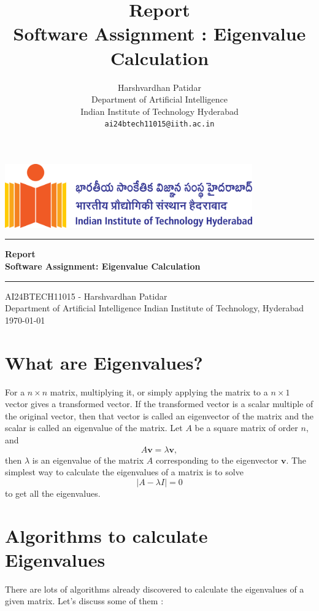 \documentclass{article}
\title{Report\\Software Assignment : Eigenvalue Calculation}
\author{Harshvardhan Patidar\\
  Department of Artificial Intelligence\\
  Indian Institute of Technology Hyderabad\\
  \texttt{ai24btech11015@iith.ac.in}
}
\newcommand{\theTitle}{Software Assignment: Eigenvalue Calculation}  %
\newcommand{\theAuthor}{AI24BTECH11015 - Harshvardhan Patidar}
\renewcommand{\vec}[1]{\mathbf{#1}}
\begin{document}
\begin{titlepage}
\pagestyle{empty}
\centering
\includegraphics[width=0.8\textwidth]{images/horzlogolong.png}
\vspace{60mm}
\hrule\vspace{2mm}
{\LARGE \textbf{\textcolor{mygreen}{Report}}}\\[8pt]
{\LARGE \textbf{\textcolor{mygreen}{\theTitle}}} \\  %
\vspace{5mm}\hrule\vspace{20mm}
{\large \theAuthor} \\[5pt]  %
{\large Department of Artificial Intelligence}
\vfill                %
{\normalsize Indian Institute of Technology, Hyderabad \\[4pt]\today} 
\end{titlepage}



\newpage
\tableofcontents
\newpage

\section{What are Eigenvalues?}\cite{youtubeeig}
For a $n \times n$ matrix, multiplying it, or simply applying the matrix to a $n \times 1$ vector gives a transformed vector. If the transformed vector is a scalar multiple of the original vector, then that vector is called an eigenvector of the matrix and the scalar is called an eigenvalue of the matrix. Let $A$ be a square matrix of order $n$, and $$A \vec{v} = \lambda \vec{v},$$ then $\lambda$ is an eigenvalue of the matrix $A$ corresponding to the eigenvector $\vec{v}$. The simplest way to calculate the eigenvalues of a matrix is to solve $$|A -\lambda I| = 0$$ to get all the eigenvalues.

\section{Algorithms to calculate Eigenvalues} \cite{Wikipedia}
There are lots of algorithms already discovered to calculate the eigenvalues of a given matrix. Let's discuss some of them : 
\end{document}
